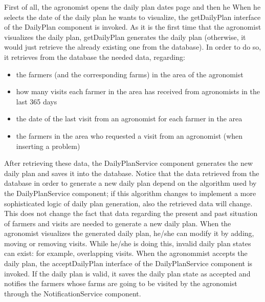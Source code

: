 \documentclass{article}
\begin{document}
First of all, the agronomist opens the daily plan dates page and then he When he selects the date of the daily plan he wants to visualize, the getDailyPlan interface of the DailyPlan component is invoked. As it is the first time that the agronomist visualizes the daily plan, getDailyPlan generates the daily plan (otherwise, it would just retrieve the already existing one from the database). In order to do so, it retrieves from the database the needed data, regarding:
\begin{itemize}
    \item the farmers (and the corresponding farms) in the area of the agronomist
    \item how many visits each farmer in the area has received from agronomists in the last 365 days
    \item the date of the last visit from an agronomist for each farmer in the area
    \item the farmers in the area who requested a visit from an agronomist (when inserting a problem)
\end{itemize}
After retrieving these data, the DailyPlanService component generates the new daily plan and saves it into the database. \newline
Notice that the data retrieved from the database in order to generate a new daily plan depend on the algorithm used by the DailyPlanService component; if this algorithm changes to implement a more sophisticated logic of daily plan generation, also the retrieved data will change. This does not change the fact that data regarding the present and past situation of farmers and visits are needed to generate a new daily plan. \newline
When the agronomist visualizes the generated daily plan, he/she can modify it by adding, moving or removing visits. While he/she is doing this, invalid daily plan states can exist: for example, overlapping visits. \newline
When the agronommist accepts the daily plan, the acceptDailyPlan interface of the DailyPlanService component is invoked. If the daily plan is valid, it saves the daily plan state as accepted and notifies the farmers whose farms are going to be visited by the agronomist through the NotificationService component.\\
\end{document}
